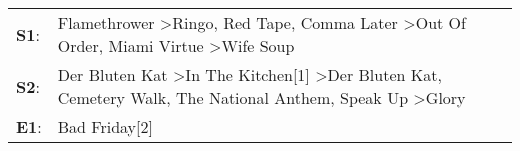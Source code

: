 \begin{supertabular}{p{0.03\textwidth}p{0.92\textwidth}}
 \textbf{S1}:  &                       Flamethrower\textsuperscript{} \textgreater \enspace Ringo\textsuperscript{}, \enspace Red Tape\textsuperscript{}, \enspace Comma Later\textsuperscript{} \textgreater \enspace Out Of Order\textsuperscript{}, \enspace Miami Virtue\textsuperscript{} \textgreater \enspace Wife Soup\textsuperscript{}  \enspace  \\
 \textbf{S2}:  &  Der Bluten Kat\textsuperscript{} \textgreater \enspace In The Kitchen[1]\textsuperscript{} \textgreater \enspace Der Bluten Kat\textsuperscript{}, \enspace Cemetery Walk\textsuperscript{}, \enspace The National Anthem\textsuperscript{}, \enspace Speak Up\textsuperscript{} \textgreater \enspace Glory\textsuperscript{}  \enspace  \\
 \textbf{E1}:  &                                                                                                                                                                                                                                                                                                 Bad Friday[2]\textsuperscript{}  \enspace  \\
\end{supertabular}

